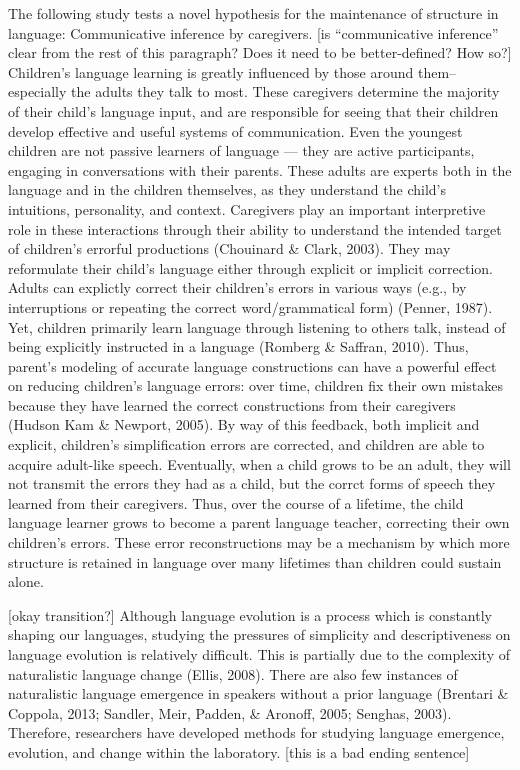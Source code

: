\documentclass[10pt, letterpaper]{article}
\begin{document}
The following study tests a novel hypothesis for the maintenance of
structure in language: Communicative inference by caregivers. {[}is
``communicative inference'' clear from the rest of this paragraph? Does
it need to be better-defined? How so?{]} Children's language learning is
greatly influenced by those around them--especially the adults they talk
to most. These caregivers determine the majority of their child's
language input, and are responsible for seeing that their children
develop effective and useful systems of communication. Even the youngest
children are not passive learners of language --- they are active
participants, engaging in conversations with their parents. These adults
are experts both in the language and in the children themselves, as they
understand the child's intuitions, personality, and context. Caregivers
play an important interpretive role in these interactions through their
ability to understand the intended target of children's errorful
productions (Chouinard \& Clark, 2003). They may reformulate their
child's language either through explicit or implicit correction. Adults
can explictly correct their children's errors in various ways (e.g., by
interruptions or repeating the correct word/grammatical form) (Penner,
1987). Yet, children primarily learn language through listening to
others talk, instead of being explicitly instructed in a language
(Romberg \& Saffran, 2010). Thus, parent's modeling of accurate language
constructions can have a powerful effect on reducing children's language
errors: over time, children fix their own mistakes because they have
learned the correct constructions from their caregivers (Hudson Kam \&
Newport, 2005). By way of this feedback, both implicit and explicit,
children's simplification errors are corrected, and children are able to
acquire adult-like speech. Eventually, when a child grows to be an
adult, they will not transmit the errors they had as a child, but the
corrct forms of speech they learned from their caregivers. Thus, over
the course of a lifetime, the child language learner grows to become a
parent language teacher, correcting their own children's errors. These
error reconstructions may be a mechanism by which more structure is
retained in language over many lifetimes than children could sustain
alone.

{[}okay transition?{]} Although language evolution is a process which is
constantly shaping our languages, studying the pressures of simplicity
and descriptiveness on language evolution is relatively difficult. This
is partially due to the complexity of naturalistic language change
(Ellis, 2008). There are also few instances of naturalistic language
emergence in speakers without a prior language (Brentari \& Coppola,
2013; Sandler, Meir, Padden, \& Aronoff, 2005; Senghas, 2003).
Therefore, researchers have developed methods for studying language
emergence, evolution, and change within the laboratory. {[}this is a bad
ending sentence{]}
\end{document}
